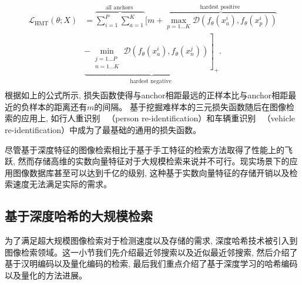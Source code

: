 \begin{equation}
    \begin{aligned}
         \mathcal{L}_{\mathrm{HMT}}(\theta ; X) &=\overbrace{\sum_{i=1}^P \sum_{a=1}^K}^{\text {all anchors }}[m+\overbrace{\max _{p=1 \ldots K} \mathcal{D}\left(f_\theta\left(x_a^i\right), f_\theta\left(x_p^i\right)\right)}^{\text {hardest positive }} \\
        & \underbrace{\left.-\min _{\substack{j=1 \ldots P \\
        n=1 \ldots K}} \mathcal{D}\left(f_\theta\left(x_a^i\right), f_\theta\left(x_n^j\right)\right)\right]_{+}}_{\text {hardest negative }}. \\
        \end{aligned}
        \label{eq:hardtri}
\end{equation}
根据如上的公式所示, 损失函数使得与anchor相距最远的正样本比与anchor相距最近的负样本的距离还有$m$的间隔。 基于挖掘难样本的三元损失函数随后在图像检索的应用上, 如行人重识别~\cite{fu2018one, wang2018learning, sun2018beyond,rahimpour2017person,xu2018attention, fang2019bilinear} （person re-identification）和车辆重识别~\cite{chu2019vehicle, meng2020fine, meng2020parsing, liu2020beyond} （vehicle re-identification）中成为了最基础的通用的损失函数。\par
尽管基于深度特征的图像检索相比于基于手工特征的检索方法取得了性能上的飞跃, 然而存储高维的实数向量特征对于大规模检索来说并不可行。现实场景下的应用图像数据库甚至可以达到千亿的级别, 这种基于实数向量特征的存储开销以及检索速度无法满足实际的需求。
\subsection{基于深度哈希的大规模检索}
为了满足超大规模图像检索对于检测速度以及存储的需求, 深度哈希技术被引入到图像检索领域。这一小节我们先介绍最近邻搜索以及近似最近邻搜索, 然后介绍了基于汉明编码以及量化编码的检索, 最后我们重点介绍了基于深度学习的哈希编码以及量化的方法进展。
